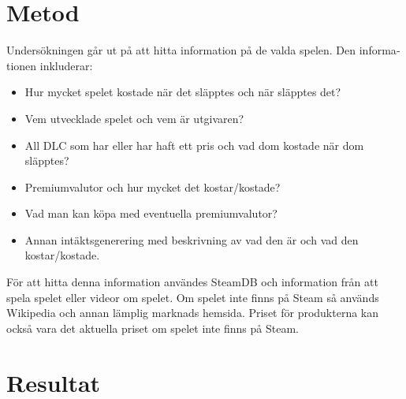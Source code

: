 \documentclass[11p]{article}
\begin{document}
\begin{otherlanguage}{swedish}
\section{Metod}

     Undersökningen går ut på att hitta information på de valda spelen.
     Den informationen inkluderar:
     \begin{itemize}
         \item Hur mycket spelet kostade när det släpptes och när släpptes det?
         \item Vem utvecklade spelet och vem är utgivaren?
         \item All DLC som har eller har haft ett pris och vad dom kostade när dom släpptes?
         \item Premiumvalutor och hur mycket det kostar/kostade?
         \item Vad man kan köpa med eventuella premiumvalutor?
         \item Annan intäktsgenerering med beskrivning av vad den är och vad den kostar/kostade.
     \end{itemize}
    För att hitta denna information användes SteamDB och information från att spela spelet eller videor om spelet.
    Om spelet inte finns på Steam så används Wikipedia och annan lämplig marknads hemsida.
    Priset för produkterna kan också vara det aktuella priset om spelet inte finns på Steam.

\section{Resultat}




\end{otherlanguage}
\end{document}
